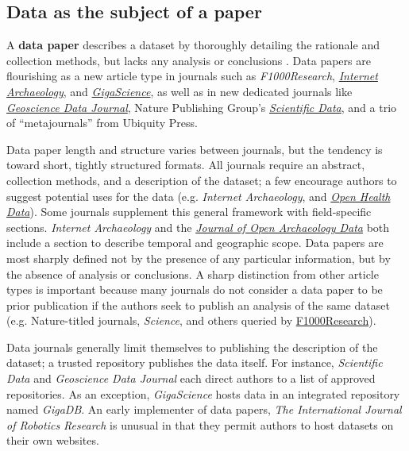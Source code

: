 \documentclass[10pt,twocolumn]{article}
\begin{document}
\subsection*{Data as the subject of a paper}\label{paper-subject-data}

A \textbf{data paper} describes a dataset by thoroughly detailing the rationale and collection methods, but lacks any analysis or conclusions \cite{newman_data_2009}.
Data papers are flourishing as a new article type in journals such as \emph{F1000Research}, \href{http://www.internetarchaeology.org/}{\emph{Internet Archaeology}}, and \href{http://www.gigasciencejournal.com/}{\emph{GigaScience}}\cite{gigascience}, as well as in new dedicated journals like \href{http://onlinelibrary.wiley.com/journal/10.1002/%28ISSN%292049-6060}{\emph{Geoscience Data Journal}}\cite{geoscience_data_journal}, Nature Publishing Group's \href{http://www.nature.com/scientificdata/}{\emph{Scientific Data}}, and a trio of ``metajournals'' from Ubiquity Press.

Data paper length and structure varies between journals, but the tendency is toward short, tightly structured formats.
All journals require an abstract, collection methods, and a description of the dataset; a few encourage authors to suggest potential uses for the data (e.g. \emph{Internet Archaeology}, and \href{http://openhealthdata.metajnl.com/about/submissions#authorGuidelines}{\emph{Open Health Data}}).
Some journals supplement this general framework with field-specific sections. 
\emph{Internet Archaeology} and the \href{http://openarchaeologydata.metajnl.com/}{\emph{Journal of Open Archaeology Data}} both include a section to describe temporal and geographic scope.
Data papers are most sharply defined not by the presence of any particular information, but by the absence of analysis or conclusions.
A sharp distinction from other article types is important because many journals do not consider a data paper to be prior publication if the authors seek to publish an analysis of the same dataset (e.g. Nature-titled journals, \emph{Science}, and others queried by \href{https://f1000research.com/data-policies}{F1000Research}).

Data journals generally limit themselves to publishing the description of the dataset; a trusted repository publishes the data itself.
For instance, \emph{Scientific Data} and \emph{Geoscience Data Journal} each direct authors to a list of approved repositories.
As an exception, \emph{GigaScience} hosts data in an integrated repository named \emph{GigaDB}.
An early implementer of data papers, \emph{The International Journal of Robotics Research}\cite{international_journal_of_robotics_research}\cite{newman_data_2009} is unusual in that they permit authors to host datasets on their own websites.
\end{document}
